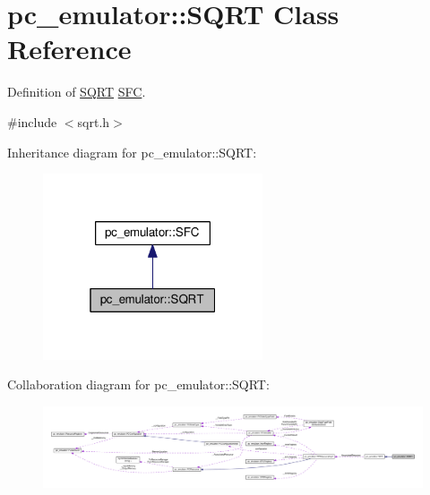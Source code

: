 \hypertarget{classpc__emulator_1_1SQRT}{}\section{pc\+\_\+emulator\+:\+:S\+Q\+RT Class Reference}
\label{classpc__emulator_1_1SQRT}


Definition of \hyperlink{classpc__emulator_1_1SQRT}{S\+Q\+RT} \hyperlink{classpc__emulator_1_1SFC}{S\+FC}.  




{\ttfamily \#include $<$sqrt.\+h$>$}



Inheritance diagram for pc\+\_\+emulator\+:\+:S\+Q\+RT\+:\nopagebreak
\begin{figure}[H]
\begin{center}
\leavevmode
\includegraphics[width=184pt]{classpc__emulator_1_1SQRT__inherit__graph}
\end{center}
\end{figure}


Collaboration diagram for pc\+\_\+emulator\+:\+:S\+Q\+RT\+:\nopagebreak
\begin{figure}[H]
\begin{center}
\leavevmode
\includegraphics[width=350pt]{classpc__emulator_1_1SQRT__coll__graph}
\end{center}
\end{figure}
